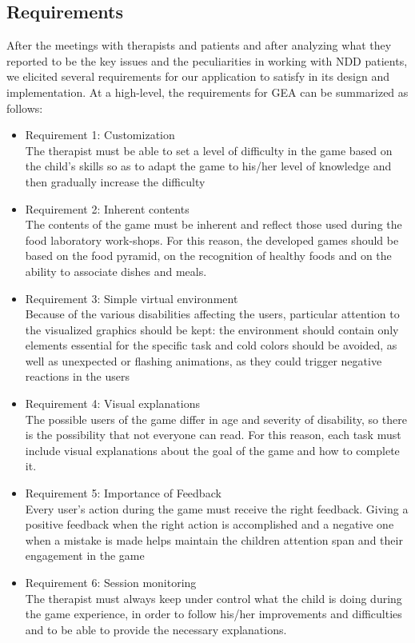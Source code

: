 \subsection{Requirements}
After the meetings with therapists and patients and after analyzing what they reported to be the key issues and the peculiarities in working with NDD patients, we elicited several requirements for our application to satisfy in its design and implementation.
At a high-level, the requirements for GEA can be summarized as follows:
\begin{itemize}
\item Requirement 1: Customization\\
The therapist must be able to set a level of difficulty in the game based on the child's skills so as to  adapt the game to his/her level of knowledge and then gradually increase the difficulty
\item Requirement 2: Inherent contents\\
The contents of the game must be inherent and reflect those used during the food laboratory work-shops.  For this reason, the developed games should be based on the food pyramid, on the recognition of healthy foods and on the ability to associate dishes and meals.
\item Requirement 3: Simple virtual environment\\
Because of the various disabilities affecting the users, particular attention to the visualized graphics should be kept: the environment should contain only elements essential for the specific task and cold colors should be avoided, as well as unexpected or flashing animations, as they could trigger negative reactions in the users
\item Requirement 4: Visual explanations\\
The possible users of the game differ in age and severity of disability, so there is the possibility that not everyone can read. For this reason, each task must include visual explanations about the goal of the game and how to complete it.
\item Requirement 5: Importance of Feedback\\
Every user's action during the game must receive the right feedback. Giving a positive feedback when the right action is accomplished and a negative one when a mistake is made helps maintain the children attention span and their engagement in the game
\item Requirement 6: Session monitoring\\
The therapist must always keep under control what the child is doing during the game experience, in order to follow his/her improvements and difficulties and to be able to provide the necessary explanations.\\
\end{itemize}
